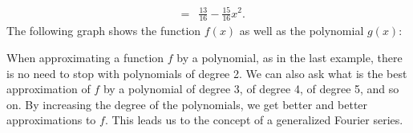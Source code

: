 \begin{solution}
\begin{eqnarray*}
    \\
    &=& \frac{13}{16} - \frac{15}{16}x^2.
  \end{eqnarray*}
  The following graph shows the function $f(x)$ as well as the
  polynomial $g(x)$:
  \begin{center}
  \end{center}
\end{solution}

When approximating a function $f$ by a polynomial, as in the last
example, there is no need to stop with polynomials of degree 2. We can
also ask what is the best approximation%
 of $f$ by a polynomial of
degree 3, of degree 4, of degree 5, and so on. By increasing the
degree of the polynomials, we get better and better approximations to
$f$. This leads us to the concept of a generalized Fourier series.

